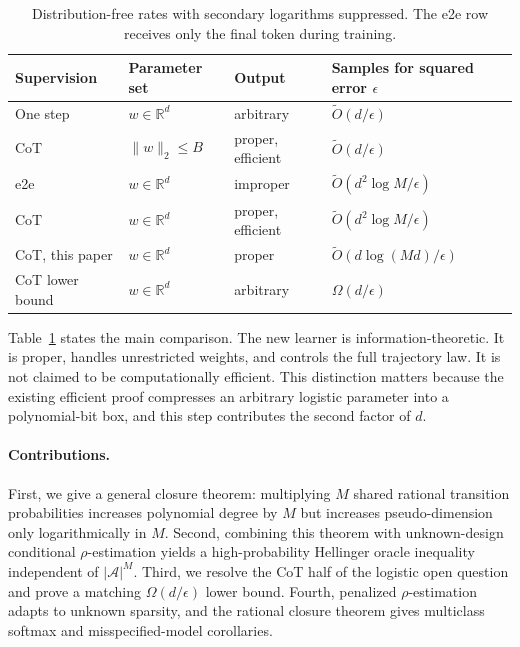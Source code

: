 \documentclass[twoside]{article}
\newcommand{\A}{\mathcal A}
\newcommand{\R}{\mathbb R}
\begin{document}
\begin{table}[t]
\caption{Distribution-free rates with secondary logarithms suppressed. The e2e row receives only the final token during training.}
\label{tab:rates}
\centering
\small
\setlength{\tabcolsep}{9pt}
\begin{tabular}{llll}
\toprule
Supervision & Parameter set & Output & Samples for squared error $\epsilon$ \\
\midrule
One step & $w\in\R^d$ & arbitrary & $\widetilde O(d/\epsilon)$ \\
CoT \citep{foster2024} & $\|w\|_2\leq B$ & proper, efficient & $\widetilde O(d/\epsilon)$ \\
e2e \citep{doron2026stochastic} & $w\in\R^d$ & improper & $\widetilde O(d^2\log M/\epsilon)$ \\
CoT \citep{doron2026stochastic} & $w\in\R^d$ & proper, efficient & $\widetilde O(d^2\log M/\epsilon)$ \\
CoT, this paper & $w\in\R^d$ & proper & $\widetilde O(d\log(Md)/\epsilon)$ \\
CoT lower bound & $w\in\R^d$ & arbitrary & $\Omega(d/\epsilon)$ \\
\bottomrule
\end{tabular}
\end{table}

Table~\ref{tab:rates} states the main comparison. The new learner is information-theoretic. It is proper, handles unrestricted weights, and controls the full trajectory law. It is not claimed to be computationally efficient. This distinction matters because the existing efficient proof compresses an arbitrary logistic parameter into a polynomial-bit box, and this step contributes the second factor of $d$.

\paragraph{Contributions.} First, we give a general closure theorem: multiplying $M$ shared rational transition probabilities increases polynomial degree by $M$ but increases pseudo-dimension only logarithmically in $M$. Second, combining this theorem with unknown-design conditional $\rho$-estimation yields a high-probability Hellinger oracle inequality independent of $|\A|^M$. Third, we resolve the CoT half of the logistic open question and prove a matching $\Omega(d/\epsilon)$ lower bound. Fourth, penalized $\rho$-estimation adapts to unknown sparsity, and the rational closure theorem gives multiclass softmax and misspecified-model corollaries.
\end{document}
